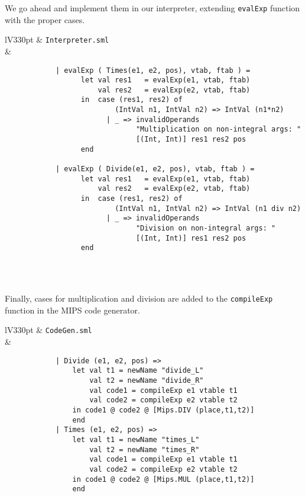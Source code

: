 \documentclass[a4paper]{article}
\begin{document}
We go ahead and implement them in our interpreter, extending \verb|evalExp| function with the proper cases.

\begin{center}	
	\begin{tabular}{lV{330pt}}
		\toprule
		& \verb|Interpreter.sml|\\
		\midrule
		&
		\begin{verbatim}
			| evalExp ( Times(e1, e2, pos), vtab, ftab ) =
			      let val res1   = evalExp(e1, vtab, ftab)
			          val res2   = evalExp(e2, vtab, ftab)
			      in  case (res1, res2) of
			              (IntVal n1, IntVal n2) => IntVal (n1*n2)
			            | _ => invalidOperands
			                   "Multiplication on non-integral args: " 
			                   [(Int, Int)] res1 res2 pos
			      end
			  
			| evalExp ( Divide(e1, e2, pos), vtab, ftab ) =
			      let val res1   = evalExp(e1, vtab, ftab)
			          val res2   = evalExp(e2, vtab, ftab)
			      in  case (res1, res2) of
			              (IntVal n1, IntVal n2) => IntVal (n1 div n2)
			            | _ => invalidOperands
			                   "Division on non-integral args: " 
			                   [(Int, Int)] res1 res2 pos
			      end
		\end{verbatim}
		\\
		\bottomrule \\
	\end{tabular}
\end{center}

Finally, cases for multiplication and division are added to the \verb|compileExp| function in the MIPS code generator.

\begin{center}	
	\begin{tabular}{lV{330pt}}
		\toprule
		& \verb|CodeGen.sml|\\
		\midrule
		&
		\begin{verbatim}
			| Divide (e1, e2, pos) =>
			    let val t1 = newName "divide_L"
			        val t2 = newName "divide_R"
			        val code1 = compileExp e1 vtable t1
			        val code2 = compileExp e2 vtable t2
			    in code1 @ code2 @ [Mips.DIV (place,t1,t2)]
			    end
			| Times (e1, e2, pos) =>
			    let val t1 = newName "times_L"
			        val t2 = newName "times_R"
			        val code1 = compileExp e1 vtable t1
			        val code2 = compileExp e2 vtable t2
			    in code1 @ code2 @ [Mips.MUL (place,t1,t2)]
			    end
		\end{verbatim}
		\\
		\bottomrule \\
	\end{tabular}
\end{center}
\end{document}
